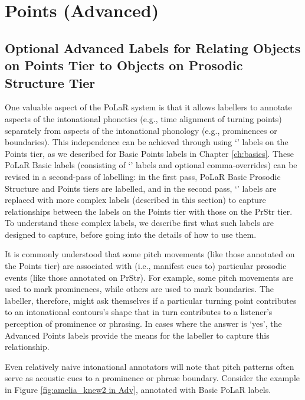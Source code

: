 \documentclass[11pt, twoside]{memoir}
\def\textlabel#1{{\relsize{-.5}\fontspec[Mapping=tex-text]{Roboto Mono}{#1}}}
\begin{document}
\section{Points (Advanced)}\label{sec:points-advanced}

\subsection{Optional Advanced Labels for Relating Objects on Points Tier to Objects on Prosodic Structure Tier}\label{sec:optional-advanced-labels-for-relating-points-tier-objects-to-prosodic-structure-tier-objects}

One valuable aspect of the PoLaR system is that it allows labellers to annotate aspects of the intonational phonetics (e.g., time alignment of turning points) separately from aspects of the intonational phonology (e.g., prominences or boundaries). This independence can be achieved through using ‘\textlabel{0}’ labels on the Points tier, as we described for Basic Points labels in Chapter \ref{ch:basics}. These PoLaR Basic labels (consisting of ‘\textlabel{0}’ labels and optional comma-overrides) can be revised in a second-pass of labelling: in the first pass, PoLaR Basic Prosodic Structure and Points tiers are labelled, and in the second pass, ‘\textlabel{0}’ labels are replaced with more complex labels (described in this section) to capture relationships between the  labels on the Points tier with those on the PrStr tier. To understand these complex labels, we describe first what such labels are designed to capture, before going into the details of how to use them.

It is commonly understood that some pitch movements (like those annotated on the Points tier) are associated with (i.e., manifest cues to) particular prosodic events (like those annotated on PrStr). For example, some pitch movements are used to mark prominences, while others are used to mark boundaries. The labeller, therefore, might ask themselves if a particular turning point contributes to an intonational contours’s shape that in turn contributes to a listener’s perception of prominence or phrasing. In cases where the answer is ‘yes’, the Advanced Points labels provide the means for the labeller to capture this relationship.

Even relatively naive intonational annotators will note that pitch patterns often serve as acoustic cues to a prominence or phrase boundary. Consider the example in Figure \ref{fig:amelia_knew2 in Adv}, annotated with Basic PoLaR labels.
\end{document}
